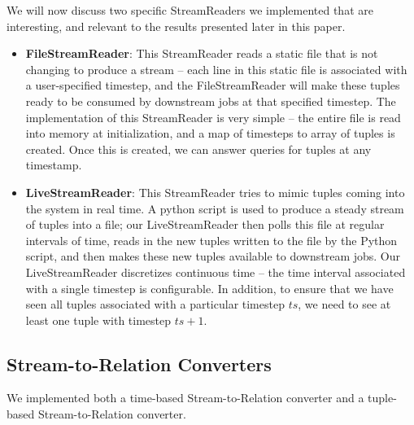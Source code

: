 \documentclass[a4paper, 10pt, conference]{IEEEconf}
\begin{document}
We will now discuss two specific StreamReaders we implemented that are interesting, and relevant to the results presented later in this paper.

\begin{itemize}
\item \textbf{FileStreamReader}: This StreamReader reads a static file that is not changing to produce a stream -- each line in this static file is associated with a user-specified timestep, and the FileStreamReader will make these tuples ready to be consumed by downstream jobs at that specified timestep.
The implementation of this StreamReader is very simple -- the entire file is read into memory at initialization, and a map of timesteps to array of tuples is created. Once this is created, we can answer queries for tuples at any timestamp.

\item \textbf{LiveStreamReader}: This StreamReader tries to mimic tuples coming into the system in real time. A python script is used to produce a steady stream of tuples into a file; our LiveStreamReader then polls this file at regular intervals of time, reads in the new tuples written to the file by the Python script, and then makes these new tuples available to downstream jobs.
Our LiveStreamReader discretizes continuous time -- the time interval associated with a single timestep is configurable. In addition, to ensure that we have seen all tuples associated with a particular timestep $ts$, we need to see at least one tuple with timestep $ts + 1$.
\end{itemize}


\subsection{Stream-to-Relation Converters}
We implemented both a time-based Stream-to-Relation converter and a tuple-based Stream-to-Relation converter. 
\end{document}
